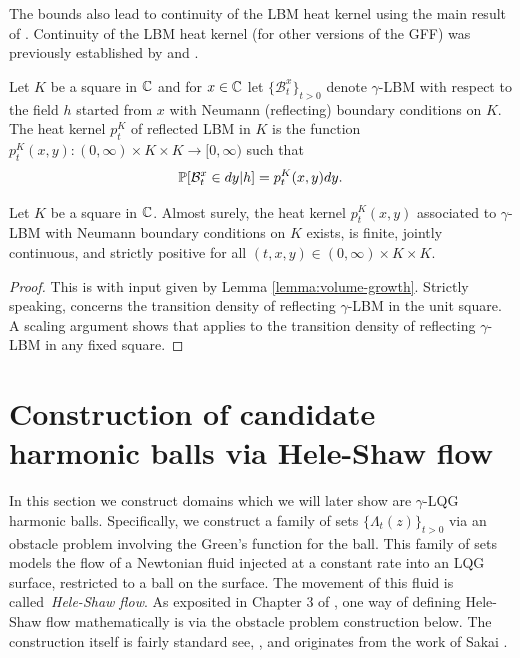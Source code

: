 \documentclass[12pt]{amsart}
\numberwithin{equation}{section}
\newcommand{\cluster}[2]{\hyperref[eq:non-co-set]{\mathit{\Lambda}^{#1}_{#2}}}
\begin{document}
	The bounds also lead to continuity of the LBM heat kernel using the main result of \cite{kigami2019}. 
	Continuity of the LBM heat kernel (for other versions of the GFF) was previously established by \cite{andres2016continuity}	and \cite{maillard2016liouville}. 
	
	
	
	Let $K$ be a square in $\C$ and for $x \in \C$ let $\{ \mathcal{B}_t^x\}_{t > 0}$ denote $\gamma$-LBM with respect to the field $h$ started from $x$ with Neumann (reflecting) boundary conditions on $K$. The heat kernel $p^K_t$ of reflected LBM in $K$ is the 
	function $p^K_t(x,y) : (0,\infty) \times K \times K \to [0,\infty)$ such that 
	\begin{equation} \label{eq:defining-property-of-kernel}
	\P[ \mathcal{B}_t^x \in dy | h] = p^K_t(x,y) dy.
	\end{equation}
	
	
	
	
	
	\begin{prop} \label{prop:lbm-continuity}
		Let $K$ be a square in $\C$. Almost surely, the heat kernel $p^K_t(x,y)$ associated to $\gamma$-LBM with Neumann boundary conditions on $K$ exists, is finite, jointly continuous, and strictly positive for all $(t,x,y) \in (0,\infty) \times K \times K$. 
	\end{prop}
	\begin{proof}
		This is \cite[Theorem 13.1]{kigami2019}   with input given by Lemma \ref{lemma:volume-growth}.
		Strictly speaking, \cite[Theorem 13.1]{kigami2019}   concerns the transition density of reflecting $\gamma$-LBM in the unit square. A scaling argument shows that \cite[Theorem 13.1]{kigami2019} applies
		to the transition density of reflecting $\gamma$-LBM in any fixed square.
	\end{proof}
	
	
	
	\section{Construction of candidate harmonic balls via Hele-Shaw flow} \label{sec:harmonic-ball-construction}
	
	
	In this section we construct domains which we will later show are $\gamma$-LQG harmonic balls. Specifically, we construct a family of sets $\{{\cluster{}{t}(z)}\}_{t > 0}$ via an obstacle problem involving the Green's function for the ball. This family of sets models the flow of a Newtonian fluid injected at a constant rate into an LQG surface, restricted to a ball on the surface. The movement of this fluid is called~\emph{Hele-Shaw flow}. As exposited in Chapter 3 of \cite{gustafsson2006conformal}, 
	one way of defining Hele-Shaw flow mathematically is via the obstacle problem construction below.  The construction itself is fairly standard see, \eg, \cite{gustafsson1990onquadraturedomains, hedenmalm2002hele,shahgholian2013harmonic} and originates from the work of Sakai \cite{sakai1984solutions}. 
	
\end{document}
